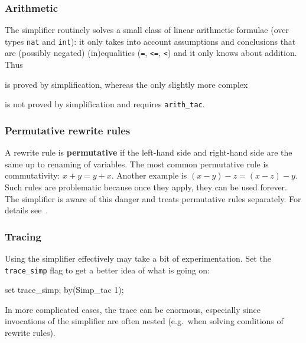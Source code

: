 \subsubsection{Arithmetic}

The simplifier routinely solves a small class of linear arithmetic formulae
(over types \texttt{nat} and \texttt{int}): it only takes into account
assumptions and conclusions that are (possibly negated) (in)equalities
(\texttt{=}, \texttt{<=}, \texttt{<}) and it only knows about addition. Thus
\begin{ttbox}
\end{ttbox}
is proved by simplification, whereas the only slightly more complex
\begin{ttbox}
\end{ttbox}
is not proved by simplification and requires \texttt{arith_tac}.

\subsubsection{Permutative rewrite rules}

A rewrite rule is {\bf permutative} if the left-hand side and right-hand side
are the same up to renaming of variables.  The most common permutative rule
is commutativity: $x+y = y+x$.  Another example is $(x-y)-z = (x-z)-y$.  Such
rules are problematic because once they apply, they can be used forever.
The simplifier is aware of this danger and treats permutative rules
separately. For details see~\cite{isabelle-ref}.

\subsubsection{Tracing}

Using the simplifier effectively may take a bit of experimentation.  Set the
\verb$trace_simp$ flag to get a better idea of what is going on:
\begin{ttbox}\makeatother
{}
\ttbreak
set trace_simp;
by(Simp_tac 1);
\ttbreak
{}
\ttbreak
{}
\ttbreak
{}
\ttbreak
{}
\ttbreak
{}
\end{ttbox}
In more complicated cases, the trace can be enormous, especially since
invocations of the simplifier are often nested (e.g.\ when solving conditions
of rewrite rules).

